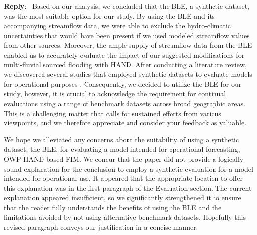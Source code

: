 \documentclass[11pt]{article}
\newcounter{reviewer}
\newcounter{point}[reviewer]
\newenvironment{reply}
   {\medskip \noindent \begin{sf}\textbf{Reply}:\  }
   {\medskip \end{sf}}
\begin{document}
\begin{reply}
Based on our analysis, we concluded that the BLE, a synthetic dataset, was the most suitable option for our study.
By using the BLE and its accompanying streamflow data, we were able to exclude the hydro-climatic uncertainties that would have been present if we used modeled streamflow values from other sources.
Moreover, the ample supply of streamflow data from the BLE enabled us to accurately evaluate the impact of our suggested modifications for multi-fluvial sourced flooding with HAND.
After conducting a literature review, we discovered several studies that employed synthetic datasets to evaluate models for operational purposes \cite{wing2017validation,hu2021real,li2022accounting,li2022comprehensive,zheng2018geoflood,wing2017validation,afshari2018comparison}.
Consequently, we decided to utilize the BLE for our study, however, it is crucial to acknowledge the requirement for continual evaluations using a range of benchmark datasets across broad geographic areas.
This is a challenging matter that calls for sustained efforts from various viewpoints, and we therefore appreciate and consider your feedback as valuable.

We hope we alleviated any concerns about the suitability of using a synthetic dataset, the BLE, for evaluating a model intended for operational forecasting, OWP HAND based FIM.
We concur that the paper did not provide a logically sound explanation for the conclusion to employ a synthetic evaluation for a model intended for operational use.
It appeared that the appropriate location to offer this explanation was in the first paragraph of the Evaluation section.
The current explanation appeared insufficient, so we significantly strengthened it to ensure that the reader fully understands the benefits of using the BLE and the limitations avoided by not using alternative benchmark datasets.
Hopefully this revised paragraph conveys our justification in a concise manner.


\end{reply}
\end{document}

